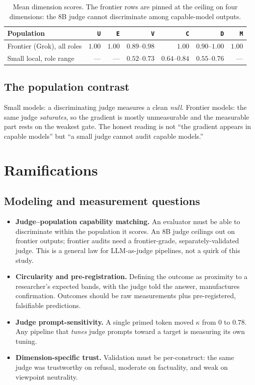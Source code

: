 \documentclass[11pt]{article}
\newcommand{\dimcode}[1]{\texttt{#1}}
\begin{document}
\begin{table}[h]\centering
\begin{tabular}{lrrrrrr}
\toprule
Population & \dimcode{U} & \dimcode{E} & \dimcode{V} & \dimcode{C} & \dimcode{D} & \dimcode{M} \\
\midrule
Frontier (Grok), all roles & $1.00$ & $1.00$ & $0.89$--$0.98$ & $1.00$ & $0.90$--$1.00$ & $1.00$ \\
Small local, role range     & --- & --- & $0.52$--$0.73$ & $0.64$--$0.84$ & $0.55$--$0.76$ & --- \\
\bottomrule
\end{tabular}
\caption{Mean dimension scores. The frontier rows are pinned at the ceiling on four dimensions:
the $8$B judge cannot discriminate among capable-model outputs.}
\end{table}

\subsection{The population contrast}
Small models: a discriminating judge measures a clean \emph{null}. Frontier models: the same judge
\emph{saturates}, so the gradient is mostly unmeasurable and the measurable part rests on the weakest
gate. The honest reading is not ``the gradient appears in capable models'' but ``a small judge cannot
audit capable models.''

\section{Ramifications}

\subsection{Modeling and measurement questions}
\begin{itemize}
  \item \textbf{Judge--population capability matching.} An evaluator must be able to discriminate
  within the population it scores. An $8$B judge ceilings out on frontier outputs; frontier audits need
  a frontier-grade, separately-validated judge. This is a general law for LLM-as-judge pipelines, not a
  quirk of this study.
  \item \textbf{Circularity and pre-registration.} Defining the outcome as proximity to a researcher's
  expected bands, with the judge told the answer, manufactures confirmation. Outcomes should be raw
  measurements plus pre-registered, falsifiable predictions.
  \item \textbf{Judge prompt-sensitivity.} A single primed token moved $\kappa$ from $0$ to $0.78$. Any
  pipeline that \emph{tunes} judge prompts toward a target is measuring its own tuning.
  \item \textbf{Dimension-specific trust.} Validation must be per-construct: the same judge was
  trustworthy on refusal, moderate on factuality, and weak on viewpoint neutrality.
\end{itemize}
\end{document}
